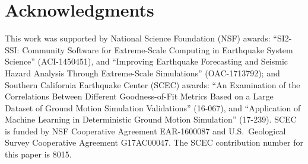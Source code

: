 
\section{Acknowledgments}
\small

This work was supported by National Science Foundation (NSF) awards: ``SI2-SSI: Community Software for Extreme-Scale Computing in Earthquake System Science'' (ACI-1450451), and ``Improving Earthquake Forecasting and Seismic Hazard Analysis Through Extreme-Scale Simulations'' (OAC-1713792); and Southern California Earthquake Center (SCEC) awards: ``An Examination of the Correlations Between Different Goodness-of-Fit Metrics Based on a Large Dataset of Ground Motion Simulation Validations'' (16-067), and ``Application of Machine Learning in Deterministic Ground Motion Simulation'' (17-239). SCEC is funded by NSF Cooperative Agreement EAR-1600087 and U.S.~Geological Survey Cooperative Agreement G17AC00047. The SCEC contribution number for this paper is 8015. 



